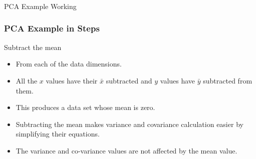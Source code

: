 

\begin{frame}[fragile]\frametitle{}
\begin{center}
{\Large PCA Example Working}
\end{center}
\end{frame}


\begin{frame}[fragile] \frametitle{PCA Example in Steps} 
Subtract the mean
\begin{itemize}
\item From each of the data dimensions. 
\item All the $x$ values have their $\bar{x}$ subtracted and $y$ values have $\bar{y}$ subtracted 
from them. 
\item This produces a data set whose mean is zero.
\item Subtracting the mean makes variance and covariance 
calculation easier by simplifying their equations. 
\item The 
variance and co-variance values are not affected by 
the mean value.
\end{itemize}
\end{frame}





